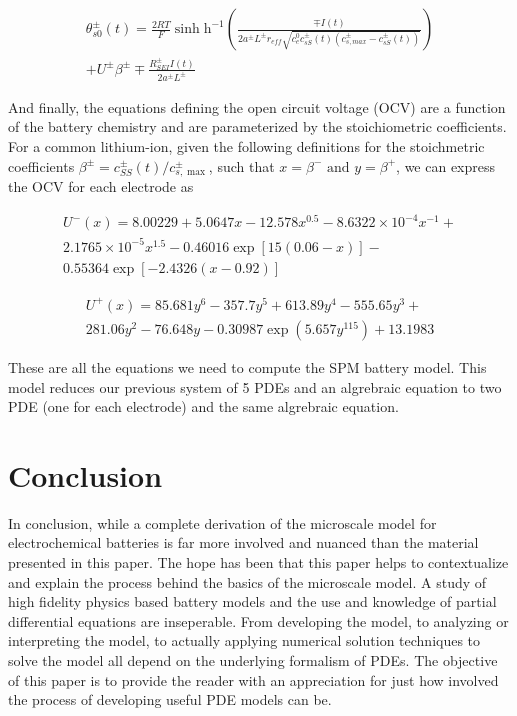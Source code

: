 \documentclass[lettersize,journal]{IEEEtran}
\begin{document}
\begin{equation}
  \begin{array}{c}
    \theta_{s 0}^{\pm}(t)=\frac{2 R T}{F} \sinh \mathrm{h}^{-1}\left(\frac{\mp I(t)}{2 a^{\pm} L^{\pm} r_{e f f} \sqrt{c_{e}^{0} c_{s S}^{\pm}(t)\left(c_{s, m a x}^{\pm}-c_{s S}^{\pm}(t)\right)}}\right) \\
    +U^{\pm} \beta^{\pm} \mp \frac{R_{S E I}^{\pm} I(t)}{2 a^{\pm} L^{\pm}}
  \end{array}
\end{equation}



\noindent And finally, the equations defining the open circuit voltage (OCV) are a function of the battery chemistry and are parameterized by the stoichiometric coefficients. For a common lithium-ion, given the following definitions for the stoichmetric coefficients $\beta^{\pm}=c_{S S}^{\pm}(t) / c_{s, \max }^{\pm}$, such that $ x = \beta^{-} \text{ and } y = \beta^{+}$, we can express the OCV for each electrode as


\begin{equation}
\begin{aligned}
U^{-}(x)=8.00229+5.0647 x-12.578 x^{0.5}-8.6322 \times 10^{-4} x^{-1}+ \\
2.1765 \times 10^{-5} x^{1.5} -0.46016 \exp [15(0.06-x)]- \\0.55364 \exp [-2.4326(x-0.92)]
\end{aligned}
\end{equation}

\begin{equation}
\begin{aligned}
U^{+}(x)=85.681 y^{6} -357.7 y^{5}+613.89 y^{4}-555.65 y^{3}+ \\
281.06 y^{2}-76.648 y -0.30987 \exp \left(5.657 y^{115}\right)+13.1983
\end{aligned}
\end{equation}

\noindent These are all the equations we need to compute the SPM battery model. This model reduces our previous system of 5 PDEs and an algrebraic equation to two PDE (one for each electrode) and the same algrebraic equation.

\section{Conclusion}
In conclusion, while a complete derivation of the microscale model for electrochemical batteries is far more involved and nuanced than the material presented in this paper. The hope has been that this paper helps to contextualize and explain the process behind the basics of the microscale model. A study of high fidelity physics based battery models and the use and knowledge of partial differential equations are inseperable. From developing the model, to analyzing or interpreting the model, to actually applying numerical solution techniques to solve the model all depend on the underlying formalism of PDEs. The objective of this paper is to provide the reader with an appreciation for just how involved the process of developing useful PDE models can be.
\end{document}
